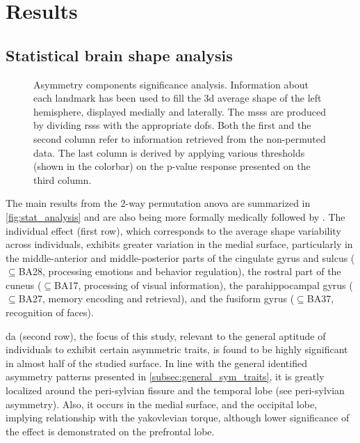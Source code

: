 \chapter{Results}\label{chap:results}
\section{Statistical brain shape analysis}

\begin{figure}[H]
	\centering
	\begin{center}
		\makebox[\textwidth]{}
	\end{center}
	\caption[Statistical brain shape analysis results]{Asymmetry components significance analysis. Information about each landmark has been used to fill the \ac{3d} average shape of the left hemisphere, displayed medially and laterally. The \acp{mss} are produced by dividing \acp{rss} with the appropriate \acp{dof}. Both the first and the second column refer to information retrieved from the non-permuted data. The last column is derived by applying various thresholds (shown in the colorbar) on the p-value response presented on the third column.}
	\label{fig:stat_analysis}	
\end{figure}

The main results from the 2-way permutation \ac{anova} are summarized in \autoref{fig:stat_analysis} and are also being more formally medically followed by \citet{Vanbiervliet2022}. The individual effect (first row), which corresponds to the average shape variability across individuals, exhibits greater variation in the medial surface, particularly in the middle-anterior and middle-posterior parts of the cingulate gyrus and sulcus ($\subseteq$BA28, processing emotions and behavior regulation), the rostral part of the cuneus ($\subseteq$BA17, processing of visual information), the parahippocampal gyrus ($\subseteq$BA27, memory encoding and retrieval), and the fusiform gyrus ($\subseteq$BA37, recognition of faces). 

\Ac{da} (second row), the focus of this study, relevant to the general aptitude of individuals to exhibit certain asymmetric traits, is found to be highly significant in almost half of the studied surface. In line with the general identified asymmetry patterns presented in \autoref{subsec:general_sym_traits}, it is greatly localized around the peri-sylvian fissure and the temporal lobe (see peri-sylvian asymmetry). Also, it occurs in the medial surface, and the occipital lobe, implying relationship with the yakovlevian torque, although lower significance of the effect is demonstrated on the prefrontal lobe.

